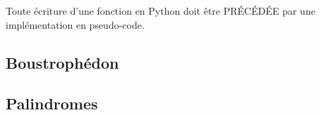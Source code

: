 

Toute écriture d'une fonction en Python doit être PR\'EC\'ED\'EE par une implémentation en pseudo-code.
\subsection{Boustrophédon}

\subsection{Palindromes}


